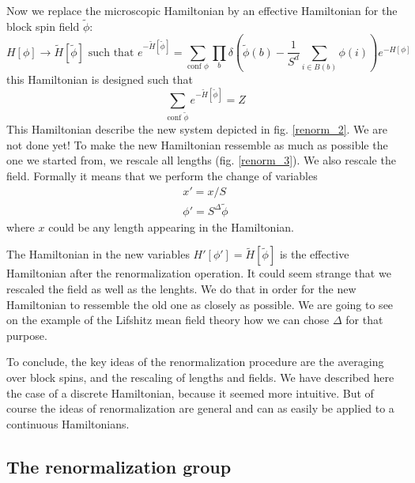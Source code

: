 Now we replace the microscopic Hamiltonian by an effective Hamiltonian for the block spin field $\tilde{\phi}$:
\begin{equation}
\label{eq:effective_ham}
H[\phi] \rightarrow \tilde{H}[\tilde{\phi}] \text{ such that } e^{-\tilde{H}[\tilde{\phi}]} = \sum_{\text{conf } \phi} \prod_{b} \delta \left( \tilde{\phi}(b) - \frac{1}{S^d} \sum_{i \in B(b)} \phi(i) \right) e^{-H[\phi]}
\end{equation}
this Hamiltonian is designed such that
\begin{equation}
\sum_{\text{conf } \tilde{\phi}} e^{-\tilde{H}[\tilde{\phi}]} = Z
\end{equation}
This Hamiltonian describe the new system depicted in fig. \ref{renorm_2}. 
We are not done yet! To make the new Hamiltonian ressemble as much as possible the one we started from, we rescale all lengths (fig. \ref{renorm_3}). We also rescale the field. Formally it means that we perform the change of variables
\begin{eqnarray}
x' = x/S  \\
\phi' = S^\Delta \tilde{\phi}
\end{eqnarray}
where $x$ could be any length appearing in the Hamiltonian.

The Hamiltonian in the new variables $H'[\phi'] = \tilde{H}[\tilde{\phi}]$ is the effective Hamiltonian after the renormalization operation.  
It could seem strange that we rescaled the field as well as the lenghts. We do that in order for the new Hamiltonian to ressemble the old one as closely as possible. We are going to see on the example of the Lifshitz mean field theory how we can chose $\Delta$ for that purpose.

To conclude, the key ideas of the renormalization procedure are the averaging over block spins, and the rescaling of lengths and fields. We have described here the case of a discrete Hamiltonian, because it seemed more intuitive. But of course the ideas of renormalization are general and can as easily be applied to a continuous Hamiltonians.

\subsection{The renormalization group}

